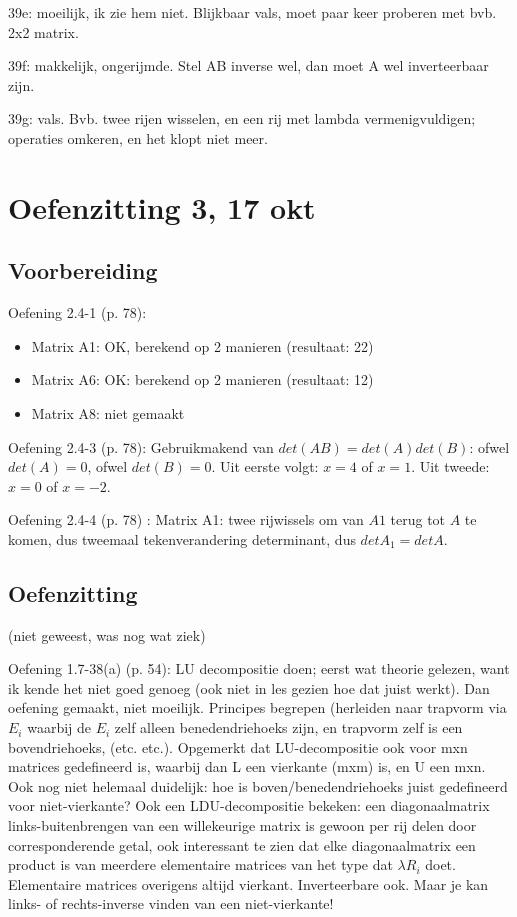 \documentclass{article}
\begin{document}
39e: moeilijk, ik zie hem niet. Blijkbaar vals, moet paar keer proberen met bvb. 2x2 matrix. 

39f: makkelijk, ongerijmde. Stel AB inverse wel, dan moet A wel inverteerbaar zijn. 

39g: vals. Bvb. twee rijen wisselen, en een rij met  lambda vermenigvuldigen; operaties omkeren, en het klopt niet meer. 



\section{Oefenzitting 3, 17 okt}

\subsection {Voorbereiding}


Oefening 2.4-1 (p. 78):  
\begin{itemize}
\item Matrix A1: OK, berekend op 2 manieren (resultaat: 22) 
\item Matrix A6: OK: berekend op 2 manieren (resultaat: 12) 
\item Matrix A8: niet gemaakt 
\end{itemize}

Oefening 2.4-3 (p. 78):   
Gebruikmakend van $det(AB)=det(A)det(B)$: ofwel $det(A)=0$, ofwel $det(B)=0$. Uit eerste volgt: $x=4$ of $x=1$. Uit tweede: $x=0$ of $x=-2$. 

Oefening 2.4-4 (p. 78) : 
Matrix A1: twee rijwissels om van $A1$ terug tot $A$ te komen, dus tweemaal tekenverandering determinant, dus $detA_1=detA$. 


\subsection{Oefenzitting}

(niet geweest, was nog wat ziek) 

Oefening 1.7-38(a) (p. 54): LU decompositie doen; eerst wat theorie gelezen, want ik kende het niet goed genoeg (ook niet in les gezien hoe dat juist werkt). Dan oefening gemaakt, niet moeilijk. Principes begrepen (herleiden naar trapvorm via $E_i$ waarbij de $E_i$ zelf alleen benedendriehoeks zijn, en trapvorm zelf is een bovendriehoeks, (etc. etc.). Opgemerkt dat LU-decompositie ook voor mxn matrices gedefineerd is, waarbij dan L een vierkante (mxm) is, en U een mxn. Ook nog niet helemaal duidelijk: hoe is boven/benedendriehoeks juist gedefineerd voor niet-vierkante? Ook een LDU-decompositie bekeken: een diagonaalmatrix links-buitenbrengen van een willekeurige matrix is gewoon per rij delen door corresponderende getal, ook interessant te zien dat elke diagonaalmatrix een product is van meerdere elementaire matrices van het type dat $\lambda R_i$ doet. Elementaire matrices overigens altijd vierkant. Inverteerbare ook. Maar je kan links- of rechts-inverse vinden van een niet-vierkante! 
\end{document}
